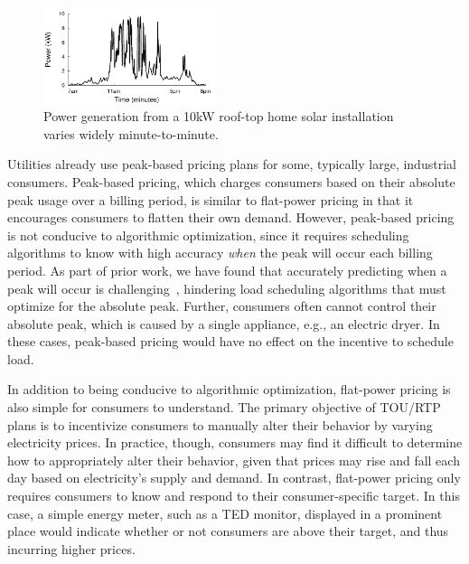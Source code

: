 \begin{figure}[t]
\begin{center}
\includegraphics[width=0.45\textwidth]{graphs/solar/solar.pdf}
\end{center}
\caption{Power generation from a 10kW roof-top home solar installation varies widely minute-to-minute.}
\label{fig:solar}
\end{figure}

Utilities already use peak-based pricing plans for some, typically large, industrial consumers. Peak-based pricing, which charges consumers based on their absolute peak usage over a billing period, is similar to flat-power pricing in that it encourages consumers to flatten their own demand.  However, peak-based pricing is not conducive to algorithmic optimization, since it requires scheduling algorithms to know with high accuracy \emph{when} the peak will occur each billing period.  As part of prior work, we have found that accurately predicting when a peak will occur is challenging~\cite{peakcharge}, hindering load scheduling algorithms that must optimize for the absolute peak. Further, consumers often cannot control their absolute peak, which is caused by a single appliance, e.g., an electric dryer.  In these cases, peak-based pricing would have no effect on the incentive to schedule load.

  In addition to being conducive to algorithmic optimization, flat-power pricing is also simple for consumers to understand.  The primary objective of TOU/RTP plans is to incentivize consumers to manually alter their behavior by varying electricity prices.  In practice, though, consumers may find it difficult to determine how to appropriately alter their behavior, given that prices may rise and fall each day based on electricity's supply and demand.  In contrast, flat-power pricing only requires consumers to know and respond to their consumer-specific target. In this case, a simple energy meter, such as a TED monitor, displayed in a prominent place would indicate whether or not consumers are above their target, and thus incurring higher prices. 

